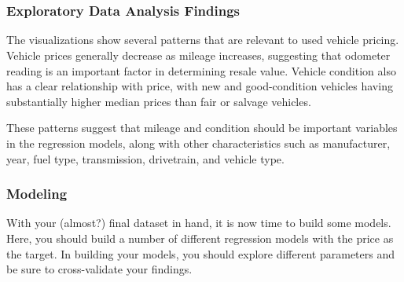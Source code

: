 \documentclass[11pt]{article}
\makeatletter
\newcommand{\boxspacing}{\kern\kvtcb@left@rule\kern\kvtcb@boxsep}
\newcommand{\prompt}[4]{
        {\ttfamily\llap{{\color{#2}[#3]:\hspace{3pt}#4}}\vspace{-\baselineskip}}
    }
\makeatother
\begin{document}
    \begin{center}
    \end{center}
    { \hspace*{\fill} \\}
    
    \begin{tcolorbox}[breakable, size=fbox, boxrule=1pt, pad at break*=1mm,colback=cellbackground, colframe=cellborder]
\prompt{In}{incolor}{19}{\boxspacing}
\begin{Verbatim}[commandchars=\\\{\}]

\end{Verbatim}
\end{tcolorbox}

    \begin{center}
    \end{center}
    { \hspace*{\fill} \\}
    
    \hypertarget{exploratory-data-analysis-findings}{%
\subsubsection{Exploratory Data Analysis
Findings}\label{exploratory-data-analysis-findings}}

The visualizations show several patterns that are relevant to used
vehicle pricing. Vehicle prices generally decrease as mileage increases,
suggesting that odometer reading is an important factor in determining
resale value. Vehicle condition also has a clear relationship with
price, with new and good-condition vehicles having substantially higher
median prices than fair or salvage vehicles.

These patterns suggest that mileage and condition should be important
variables in the regression models, along with other characteristics
such as manufacturer, year, fuel type, transmission, drivetrain, and
vehicle type.

    \hypertarget{modeling}{%
\subsubsection{Modeling}\label{modeling}}

With your (almost?) final dataset in hand, it is now time to build some
models. Here, you should build a number of different regression models
with the price as the target. In building your models, you should
explore different parameters and be sure to cross-validate your
findings.
\end{document}
